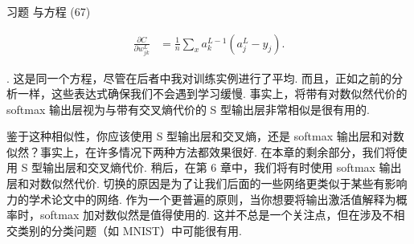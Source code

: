 \begin{exerciseBox}{习题}
\noindent 与方程 (67)

\begin{align*}
\frac{\partial C}{\partial w^L_{jk}} &= \frac{1}{n} \sum_x a^{L-1}_k (a^L_j-y_j). \nonumber
\end{align*}

\noindent. 这是同一个方程，尽管在后者中我对训练实例进行了平均. 而且，正如之前的分析一样，这些表达式确保我们不会遇到学习缓慢. 事实上，将带有对数似然代价的 softmax 输出层视为与带有交叉熵代价的 S 型输出层非常相似是很有用的.

鉴于这种相似性，你应该使用 S 型输出层和交叉熵，还是 softmax 输出层和对数似然？事实上，在许多情况下两种方法都效果很好. 在本章的剩余部分，我们将使用 S 型输出层和交叉熵代价. 稍后，在第 6 章中，我们将有时使用 softmax 输出层和对数似然代价. 切换的原因是为了让我们后面的一些网络更类似于某些有影响力的学术论文中的网络. 作为一个更普遍的原则，当你想要将输出激活值解释为概率时，softmax 加对数似然是值得使用的. 这并不总是一个关注点，但在涉及不相交类别的分类问题（如 MNIST）中可能很有用.

\end{exerciseBox}

